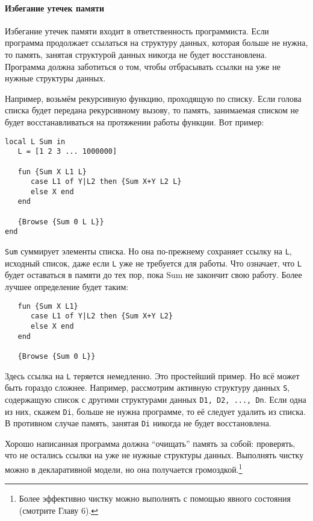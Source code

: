\paragraph{Избегание утечек памяти}

Избегание утечек памяти входит в ответственность программиста. Если программа продолжает ссылаться на структуру данных, которая больше не нужна, то память, занятая структурой данных никогда не будет восстановлена. Программа должна заботиться о том, чтобы отбрасывать ссылки на уже не нужные структуры данных.

Например, возьмём рекурсивную функцию, проходящую по списку. Если голова списка будет передана рекурсивному вызову, то память, занимаемая списком не будет восстанавливаться на протяжении работы функции. Вот пример:

\begin{lstlisting}
local L Sum in
   L = [1 2 3 ... 1000000]

   fun {Sum X L1 L}
      case L1 of Y|L2 then {Sum X+Y L2 L}
      else X end
   end

   {Browse {Sum 0 L L}}
end
\end{lstlisting}

\lstinline|Sum| суммирует элементы списка. Но она по-прежнему сохраняет ссылку на \lstinline|L|, исходный список, даже если \lstinline|L| уже не требуется для работы. Что означает, что \lstinline|L| будет оставаться в памяти до тех пор, пока Sum не закончит свою работу. Более лучшее определение будет таким:

\begin{lstlisting}
   fun {Sum X L1}
      case L1 of Y|L2 then {Sum X+Y L2}
      else X end
   end

   {Browse {Sum 0 L}}
\end{lstlisting}

Здесь ссылка на \lstinline|L| теряется немедленно. Это простейший пример. Но всё может быть гораздо сложнее. Например, рассмотрим активную структуру данных \lstinline|S|, содержащую список с другими структурами данных \lstinline|D1, D2, ..., Dn|. Если одна из них, скажем \lstinline|Di|, больше не нужна программе, то её следует удалить из списка. В противном случае память, занятая \lstinline|Di| никогда не будет восстановлена.

Хорошо написанная программа должна ``очищать'' память за собой: проверять, что не остались ссылки на уже не нужные структуры данных. Выполнять чистку можно в декларативной модели, но она получается громоздкой.\footnote{Более эффективно чистку можно выполнять с помощью явного состояния (смотрите Главу 6).}



